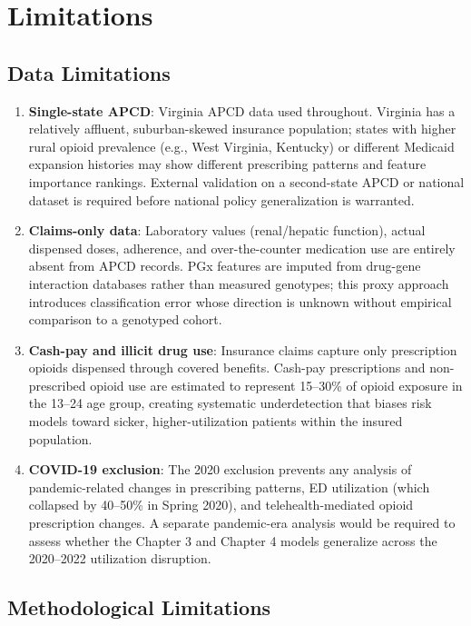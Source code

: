 \documentclass[
  12pt,
]{book}
\providecommand{\tightlist}{%
  \setlength{\itemsep}{0pt}\setlength{\parskip}{0pt}}
\begin{document}
\chapter{Limitations}\label{sec-limitations}

\section{Data Limitations}\label{data-limitations}

\begin{enumerate}
\def\labelenumi{\arabic{enumi}.}
\tightlist
\item
  \textbf{Single-state APCD}: Virginia APCD data used throughout.
  Virginia has a relatively affluent, suburban-skewed insurance
  population; states with higher rural opioid prevalence (e.g., West
  Virginia, Kentucky) or different Medicaid expansion histories may show
  different prescribing patterns and feature importance rankings.
  External validation on a second-state APCD or national dataset is
  required before national policy generalization is warranted.
\item
  \textbf{Claims-only data}: Laboratory values (renal/hepatic function),
  actual dispensed doses, adherence, and over-the-counter medication use
  are entirely absent from APCD records. PGx features are imputed from
  drug-gene interaction databases rather than measured genotypes; this
  proxy approach introduces classification error whose direction is
  unknown without empirical comparison to a genotyped cohort.
\item
  \textbf{Cash-pay and illicit drug use}: Insurance claims capture only
  prescription opioids dispensed through covered benefits. Cash-pay
  prescriptions and non-prescribed opioid use are estimated to represent
  15--30\% of opioid exposure in the 13--24 age group, creating
  systematic underdetection that biases risk models toward sicker,
  higher-utilization patients within the insured population.
\item
  \textbf{COVID-19 exclusion}: The 2020 exclusion prevents any analysis
  of pandemic-related changes in prescribing patterns, ED utilization
  (which collapsed by 40--50\% in Spring 2020), and telehealth-mediated
  opioid prescription changes. A separate pandemic-era analysis would be
  required to assess whether the Chapter 3 and Chapter 4 models
  generalize across the 2020--2022 utilization disruption.
\end{enumerate}

\section{Methodological Limitations}\label{methodological-limitations}
\end{document}
